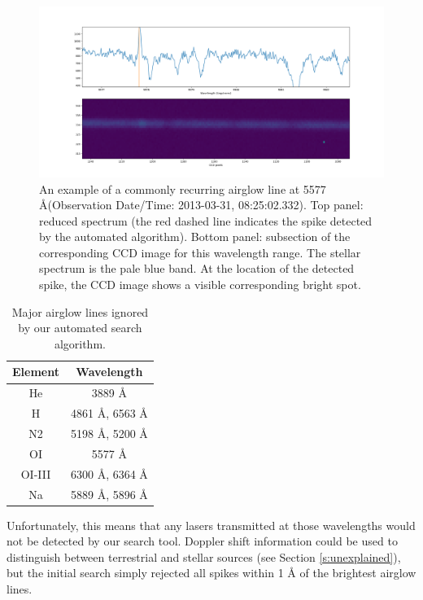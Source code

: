 \documentclass[twocolumn]{aastex701}
\begin{document}
\begin{figure}
    \centering
    \includegraphics[width=\textwidth]{airglowexample.png}
    \caption{An example of a commonly recurring airglow line at 5577 \AA (Observation Date/Time: 2013-03-31, 08:25:02.332). Top panel: reduced spectrum (the red dashed line indicates the spike detected by the automated algorithm).  Bottom panel: subsection of the corresponding CCD image for this wavelength range. The stellar spectrum is the pale blue band. At the location of the detected spike, the CCD image shows a visible corresponding bright spot.}
    \label{fig:airglowexample}
\end{figure}

\begin{table}
\begin{center}
\begin{tabular}{|c|c|} 
 \hline
 Element & Wavelength \\ 
 \hline
 He & 3889 \AA \\ 
 \hline
 H & 4861 \AA, 6563 \AA \\ 
 \hline
 N2 & 5198 \AA, 5200 \AA \\ 
 \hline
 OI & 5577 \AA \\
 \hline
 OI-III & 6300 \AA, 6364 \AA \\
 \hline
 Na & 5889 \AA , 5896 \AA \\
 \hline
 \end{tabular}
\end{center}
 \caption{Major airglow lines ignored by our automated search algorithm.}
 \label{table:AirglowWavelengths}
\end{table}

Unfortunately, this means that any lasers transmitted at those wavelengths would not be detected by our search tool.  Doppler shift information could be used to distinguish between terrestrial and stellar sources (see Section \ref{s:unexplained}), but the initial search simply rejected all spikes within 1 {\AA} of the brightest airglow lines.
\end{document}
